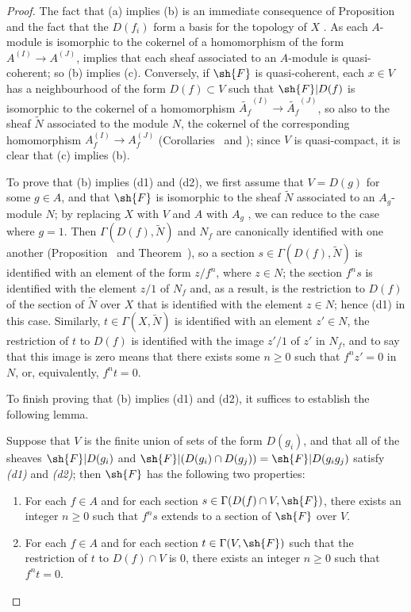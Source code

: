 \begin{proof}
The fact that (a) implies (b) is an immediate consequence of Proposition~ and the fact that the $D(f_i)$ form a basis for the topology of $X$ .
As each $A$-module is isomorphic to the cokernel of a homomorphism of the form $A^{(I)}\to A^{(J)}$,  implies that each sheaf associated to an $A$-module is quasi-coherent;
so (b) implies (c).
Conversely, if $\sh{F}$ is quasi-coherent, each $x\in V$ has a neighbourhood of the form $D(f)\subset V$ such that $\sh{F}|D(f)$ is isomorphic to the cokernel of a homomorphism $\widetilde{A_f}^{(I)}\to\widetilde{A_f}^{(J)}$, so also to the sheaf $\widetilde{N}$ associated to the module $N$, the cokernel of the corresponding homomorphism
$A_f^{(I)}\to A_f^{(J)}$ (Corollaries~ and );
since $V$ is quasi-compact, it is clear that (c) implies (b).

To prove that (b) implies (d1) and (d2), we first assume that $V=D(g)$ for some $g\in A$, and that $\sh{F}$ is isomorphic to the sheaf $\widetilde{N}$ associated to an $A_g$-module $N$;
by replacing $X$ with $V$ and $A$ with $A_g$ , we can reduce to the case where $g=1$.
Then $\Gamma(D(f),\widetilde{N})$ and $N_f$ are canonically identified with one another (Proposition~ and Theorem~), so a section $s\in\Gamma(D(f),\widetilde{N})$ is identified with an element of the form $z/f^n$, where $z\in N$;
the section $f^n s$ is identified with the element $z/1$ of $N_f$ and, as a result, is the restriction to $D(f)$ of the section of $\widetilde{N}$ over $X$ that is identified with the element $z\in N$;
hence (d1) in this case.
Similarly, $t\in\Gamma(X,\widetilde{N})$ is identified with an element $z'\in N$, the restriction of $t$ to $D(f)$ is identified with the image $z'/1$ of $z'$ in $N_f$, and to say that this image is zero means that there exists some $n\geq 0$ such that $f^n z'=0$ in $N$, or, equivalently, $f^n t=0$.

To finish proving that (b) implies (d1) and (d2), it suffices to establish the following lemma.
\begin{lemma}[1.4.1.1]
\label{I.1.4.1.1}
Suppose that $V$ is the finite union of sets of the form $D(g_i)$, and that all of the sheaves $\sh{F}|D(g_i)$ and $\sh{F}|(D(g_i)\cap D(g_j))=\sh{F}|D(g_i g_j)$ satisfy \emph{(d1)} and \emph{(d2)};
then $\sh{F}$ has the following two properties:
\begin{enumerate}
  \item[{\rm(d'1)}] For each $f\in A$ and for each section $s\in\Gamma(D(f)\cap V,\sh{F})$, there exists an integer $n\geq 0$ such that $f^n s$ extends to a section of $\sh{F}$ over $V$.
  \item[{\rm(d'2)}] For each $f\in A$ and for each section $t\in\Gamma(V,\sh{F})$ such that the restriction of $t$ to $D(f)\cap V$ is $0$, there exists an integer $n\geq 0$ such that $f^n t=0$.
\end{enumerate}
\end{lemma}


\end{proof}
